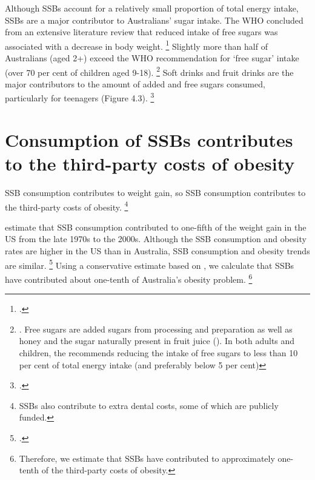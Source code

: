 \documentclass[embargoed]{grattan}
\begin{document}
Although SSBs account for a relatively small proportion of total energy intake, SSBs are a major contributor to Australians' sugar intake.
The WHO concluded from an extensive literature review that reduced intake of free sugars was associated with a decrease in body weight.%
\footcite{Organisation2015Sugarsintakeadults} Slightly more than half of Australians (aged 2+) exceed the WHO recommendation for `free sugar' intake (over 70 per cent of children aged 9-18).%
\footnote{\textcite{Lei2016Dietaryintakefood}.
Free sugars are added sugars from processing and preparation as well as honey and the sugar naturally present in fruit juice (\textcite[][Table~3.1]{ABS20164364055011AustralianHealth}).
In both adults and children, the \textcite{Organisation2015Sugarsintakeadults} recommends reducing the intake of free sugars to less than 10 per cent of total energy intake (and preferably below 5 per cent)} Soft drinks and fruit drinks are the major contributors to the amount of added and free sugars consumed, particularly for teenagers (Figure 4.3).%
\footcite{ABS20164364055011AustralianHealth}

\section{Consumption of SSBs contributes to the third-party costs of obesity}\label{consumption-of-ssbs-contributes-to-the-third-party-costs-of-obesity}

SSB consumption contributes to weight gain, so SSB consumption contributes to the third-party costs of obesity.%
\footnote{SSBs also contribute to extra dental costs, some of which are publicly funded.}

\textcite{Woodward-Lopez2010whatextenthave} estimate that SSB consumption contributed to one-fifth of the weight gain in the US from the late 1970s to the 2000s.
Although the SSB consumption and obesity rates are higher in the US than in Australia, SSB consumption and obesity trends are similar.%
\footcites{Popkin2016Sweeteningglobaldiet}{Silver2015IdBuyEmerging} Using a conservative estimate based on \textcite{Woodward-Lopez2010whatextenthave}, we calculate that SSBs have contributed about one-tenth of Australia's obesity problem.%
\footnote{Therefore, we estimate that SSBs have contributed to approximately one-tenth of the third-party costs of obesity.}
\end{document}
